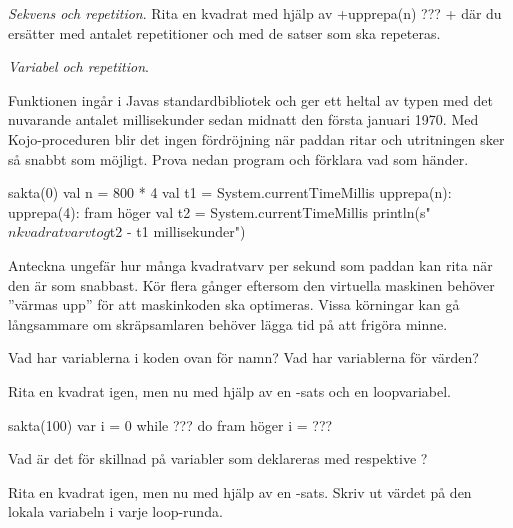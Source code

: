 \Task \textit{Sekvens och repetition}. Rita en kvadrat med hjälp av \code+upprepa(n){ ??? }+ där du ersätter  med antalet repetitioner och  med de satser som ska repeteras.






\Task \textit{Variabel och repetition}.

\Subtask Funktionen  ingår i Javas standardbibliotek och ger ett heltal av typen  med det nuvarande antalet millisekunder sedan midnatt den första januari 1970.  Med Kojo-proceduren  blir det ingen fördröjning när paddan ritar och utritningen sker så snabbt som möjligt. Prova nedan program och förklara vad som händer.
\begin{Code}
sakta(0)
val n = 800 * 4
val t1 = System.currentTimeMillis
upprepa(n):
  upprepa(4):
    fram
    höger
val t2 = System.currentTimeMillis
println(s"$n kvadratvarv tog ${t2 - t1} millisekunder")
\end{Code}

\Subtask\Pen Anteckna ungefär hur många kvadratvarv per sekund som paddan kan rita när den är som snabbast. Kör flera gånger eftersom den virtuella maskinen behöver ''värmas upp'' för att maskinkoden ska optimeras. Vissa körningar kan gå långsammare om skräpsamlaren behöver lägga tid på att frigöra minne.

\Subtask\Pen Vad har variablerna i koden ovan för namn? Vad har variablerna för värden?

\Subtask Rita en kvadrat igen, men nu med hjälp av en -sats och en loopvariabel. %

\begin{Code}
sakta(100)
var i = 0
while ??? do
  fram
  höger
  i = ???
\end{Code}

\Subtask\Pen Vad är det för skillnad på variabler som deklareras med  respektive ?

\Subtask Rita en kvadrat igen, men nu med hjälp av en -sats. Skriv ut värdet på den lokala variabeln  i varje loop-runda.

